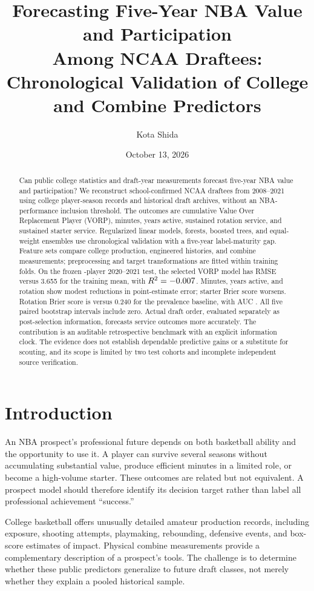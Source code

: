 \documentclass[11pt]{article}
\title{Forecasting Five-Year NBA Value and Participation\\Among NCAA Draftees:\\Chronological Validation of College and Combine Predictors}
\author{Kota Shida}
\date{October 13, 2026}
\begin{document}
\maketitle
\begin{abstract}
Can public college statistics and draft-year measurements forecast five-year NBA value and participation? We reconstruct \SampleN{} school-confirmed NCAA draftees from 2008--2021 using \CollegeN{} college player-season records and historical draft archives, without an NBA-performance inclusion threshold. The outcomes are cumulative Value Over Replacement Player (VORP), minutes, years active, sustained rotation service, and sustained starter service. Regularized linear models, forests, boosted trees, and equal-weight ensembles use chronological validation with a five-year label-maturity gap. Feature sets compare college production, engineered histories, and combine measurements; preprocessing and target transformations are fitted within training folds. On the frozen \TestN{}-player 2020--2021 test, the selected VORP model has RMSE \vorpFivermse{} versus 3.655 for the training mean, with $R^2=-0.007{}$. Minutes, years active, and rotation show modest reductions in point-estimate error; starter Brier score worsens. Rotation Brier score is \rotationFivebrier{} versus 0.240 for the prevalence baseline, with AUC \rotationFiveauc{}. All five paired bootstrap intervals include zero. Actual draft order, evaluated separately as post-selection information, forecasts service outcomes more accurately. The contribution is an auditable retrospective benchmark with an explicit information clock. The evidence does not establish dependable predictive gains or a substitute for scouting, and its scope is limited by two test cohorts and incomplete independent source verification.
\end{abstract}

\section{Introduction}
An NBA prospect's professional future depends on both basketball ability and the opportunity to use it. A player can survive several seasons without accumulating substantial value, produce efficient minutes in a limited role, or become a high-volume starter. These outcomes are related but not equivalent. A prospect model should therefore identify its decision target rather than label all professional achievement ``success.''

College basketball offers unusually detailed amateur production records, including exposure, shooting attempts, playmaking, rebounding, defensive events, and box-score estimates of impact. Physical combine measurements provide a complementary description of a prospect's tools. The challenge is to determine whether these public predictors generalize to future draft classes, not merely whether they explain a pooled historical sample.
\end{document}
